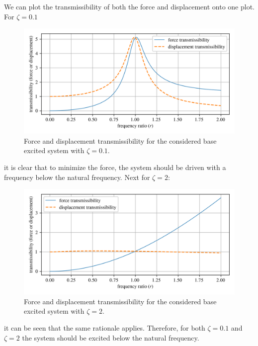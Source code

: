 \documentclass[12pt,letter]{article}
\begin{document}
\begin{example}
			\noindent  We can plot the transmissibility of both the force and displacement onto one plot. For $\zeta=0.1$
			\begin{figure}[H]
				\centering
				\includegraphics[]{../figures/base_excitation_force_and_displacement_transmissibility_1.png}
				\caption{Force and displacement transmissibility for the considered base excited system with $\zeta=0.1$.}
			\end{figure}
			\noindent it is clear that to minimize the force, the system should be driven with a frequency below the natural frequency. Next for  $\zeta=2$:
			\begin{figure}[H]
				\centering
				\includegraphics[]{../figures/base_excitation_force_and_displacement_transmissibility_2.png}
				\caption{Force and displacement transmissibility for the considered base excited system with $\zeta=2$.}
			\end{figure}
			\noindent it can be seen that the same rationale applies. Therefore, for both $\zeta=0.1$ and $\zeta=2$ the system should be excited below the natural frequency.
		
		\end{example}

		
					
\end{document}
